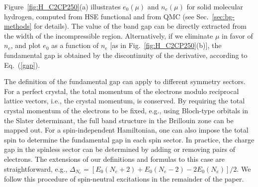 Figure~\ref{fig:H_C2CP250}(a) illustrates $e_0(\mu)$ and $n_e(\mu)$ for solid molecular hydrogen, computed from HSE functional and from QMC (see Sec.~\ref{sec:bg-methods} for details). The value of the band
gap can be directly extracted from the width of the incompressible region.
Alternatively, if we
eliminate $\mu$ in favor of $n_e$, and plot $e_0$ as a function of $n_e$ [as in Fig.~\ref{fig:H_C2CP250}(b)],
the fundamental gap is obtained by the discontinuity of the derivative, according to 
Eq.~(\ref{gap}).

The definition of the fundamental gap can apply to different symmetry sectors.
For a perfect crystal, the total momentum of the electrons modulo 
reciprocal lattice vectors, i.e., the crystal momentum, is conserved. By requiring the total crystal momentum of the electrons to be fixed,
e.g., using Bloch-type orbitals in the Slater determinant,
the full band structure in the Brillouin zone can be mapped out.
For a spin-independent Hamiltonian, one can also impose the total spin 
to determine the fundamental gap in each spin sector. %
In practice, the charge gap in the spinless sector can
be determined by  adding or removing pairs of electrons. The extensions of our definitions and formulas to this case are straightforward,
e.g., $\Delta_{N_e}=[E_0(N_e+2)+E_0(N_e-2)-2E_0(N_e)]/2$. We follow this procedure of spin-neutral excitations in the remainder of the paper.

